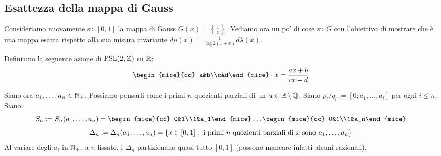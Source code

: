 \subsection{Esattezza della mappa di Gauss}
Consideriamo nuovamente su $[0,1]$ la mappa di Gauss $G(x)=\left\{\frac{1}{x}\right\}$. Vediamo ora un po' di cose su $G$ con l'obiettivo di mostrare che \`e una mappa esatta rispetto alla sua misura invariante $d\mu(x)=\frac{1}{\log 2 (1+x)}d\lambda(x)$.

Definiamo la seguente azione di $\mathrm{PSL}(2,\mathbb{Z})$ su $\mathbb{R}$:
$$\begin{mice}{cc} a&b\\c&d\end{mice} \cdot x=\frac{ax+b}{cx+d}$$

Siano ora $a_1,\dots,a_n\in \mathbb{N}_+$. Possiamo pensarli come i primi $n$ quozienti parziali di un $\alpha\in \mathbb{R}\setminus \mathbb{Q}$. Siano $p_i/q_i:=[0;a_1,\dots,a_i]$ per ogni $i\leq n$. Siano:
$$S_n:=S_n(a_1,\dots,a_n)=\begin{mice}{cc} 0&1\\1&a_1\end{mice}\dots \begin{mice}{cc} 0&1\\1&a_n\end{mice}$$
$$\Delta_n:=\Delta_n(a_1,\dots,a_n)=\left\{x\in [0,1]: \text{ i primi $n$ quozienti parziali di $x$ sono } a_1,\dots, a_n\right\}$$
Al variare degli $a_i$ in $\mathbb{N}_+$, a $n$ fissato, i $\Delta_n$ partizionano quasi tutto $[0,1]$ (possono mancare infatti alcuni razionali).

